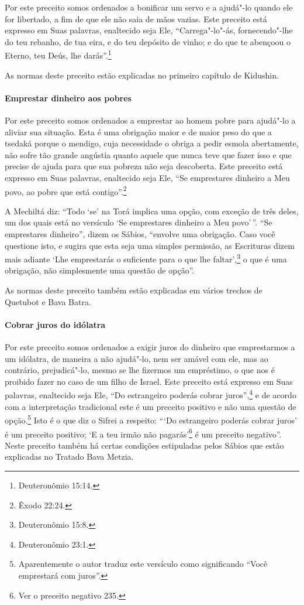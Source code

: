 \begin{multicols}{2}
Por este preceito somos ordenados a bonificar um servo e a ajudá"-lo
quando ele for libertado, a fim de que ele não saia de mãos vazias. Este
preceito está expresso em Suas palavras, enaltecido seja Ele,
``Carrega"-lo"-ás, fornecendo"-lhe do teu rebanho, de tua eira, e do teu
depósito de vinho; e do que te abençoou o Eterno, teu Deús, lhe darás''.\footnote{Deuteronômio 15:14.}

As normas deste preceito estão explicadas no primeiro capítulo de Kidushin\starr.

\paragraph{Emprestar dinheiro aos pobres}

Por este preceito somos ordenados a emprestar ao homem pobre para
ajudá"-lo a aliviar sua situação. Esta é uma obrigação maior e de maior
peso do que a tsedaká\starr{} porque o mendigo, cuja necessidade o obriga a
pedir esmola abertamente, não sofre tão grande angústia quanto aquele
que nunca teve que fazer isso e que precise de ajuda para que sua
pobreza não seja descoberta. Este preceito está expresso em Suas
palavras, enaltecido seja Ele, ``Se emprestares dinheiro a Meu povo, ao
pobre que está contigo''.\footnote{Êxodo 22:24.}

A Mechiltá\starr{} diz: ``Todo `se' na Torá\starr{} implica uma opção, com exceção de
três deles, um dos quais está no versículo `Se emprestares dinheiro a
Meu povo'\,''. ``Se emprestares dinheiro'', dizem os Sábios, ``envolve uma
obrigação. Caso você questione isto, e sugira que esta seja uma simples
permissão, as Escrituras dizem mais adiante `Lhe emprestarás o
suficiente para o que lhe faltar',\footnote{Deuteronômio 15:8.} o que é uma
obrigação, não simplesmente uma questão de opção''.

As normas deste preceito também estão explicadas em vários trechos de
Quetubot\starr{} e Bava Batra\starr.

\paragraph{Cobrar juros do idólatra}

Por este preceito somos ordenados a exigir juros do dinheiro que
emprestarmos a um idólatra, de maneira a não ajudá"-lo, nem ser amável
com ele, mas ao contrário, prejudicá"-lo, mesmo se lhe fizermos um
empréstimo, o
que nos é proibido fazer no caso de um filho de Israel. Este preceito
está expresso em Suas palavras, enaltecido seja Ele, ``Do estrangeiro poderás
cobrar juros'',\footnote{Deuteronômio 23:1.} e de acordo com a interpretação
tradicional este
é um preceito positivo e não uma questão de opção.\footnote{Aparentemente o autor traduz este versículo como significando ``Você
  emprestará com juros''.}
Isto é o que diz o Sifrei\starr{} a respeito: ```Do estrangeiro poderás cobrar juros' é um preceito positivo;
`E a teu irmão não pagarás'\footnote{Ver o preceito negativo 235.} é um preceito
negativo''. Neste preceito também
há certas condições estipuladas pelos Sábios que estão explicadas no
Tratado Bava Metzia\starr.


\end{multicols}
